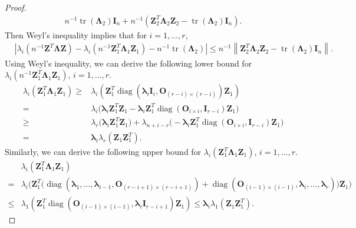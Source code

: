 \documentclass[12pt]{article} %
\DeclareMathOperator{\mytr}{tr}
\DeclareMathOperator{\mydiag}{diag}
\newcommand{\bZ}{\mathbf{Z}}
\newcommand{\bO}{\mathbf{O}}
\newcommand{\bI}{\mathbf{I}}
\newcommand{\bfsym}[1]{\ensuremath{\boldsymbol{#1}}}
\def\blambda {\bfsym {\lambda}}
\def\bLambda {\bfsym {\Lambda}}
\theoremstyle{definition}
\begin{document}
\begin{appendices}
\begin{proof}
\begin{equation*}
\begin{split}
        n^{-1}\mytr(\bLambda_2)\bI_n+
        n^{-1}\left(\bZ_2^T \bLambda_2 \bZ_2-\mytr(\bLambda_2)\bI_n\right)
        .
        \end{split}
    \end{equation*}
    Then Weyl's inequality implies that for $ i=1,\ldots, r$,
    \begin{equation}\label{eigenBoundForF}
        \begin{split}
        &
        \left|
        \lambda_i\left(n^{-1}\bZ^T \bLambda \bZ\right)
        -
        \lambda_i(n^{-1}\bZ_1^T \bLambda_1 \bZ_1)
        -
        n^{-1}
        \mytr(\bLambda_2)
        \right|
        \leq
        n^{-1}\left\|\bZ_2^T \bLambda_2 \bZ_2-
        \mytr(\bLambda_2)
        \bI_n\right\|.
        \end{split}
    \end{equation}
    Using Weyl's inequality, we can derive the following lower bound for $\lambda_i(n^{-1}\bZ_1^T \bLambda_1 \bZ_1)$, $ i=1,\ldots, r$.
\begin{equation*}\label{eq:DLower}
\begin{aligned}
\lambda_i(\bZ_1^T \bLambda_1 \bZ_1)
\geq&
\lambda_i(\bZ_1^T \mydiag(\blambda_i \bI_{i},\bO_{(r-i)\times(r-i)}) \bZ_1)
\\
    =&
    \lambda_i\Big( \blambda_i \bZ_1^T \bZ_1-\blambda_i\bZ_1^T \mydiag(\bO_{i\times i}, \bI_{r-i}) \bZ_1\Big)\\
    \geq&
    \lambda_r\Big( \blambda_i \bZ_1^T \bZ_1\Big)+\lambda_{n+i-r}\Big(-\blambda_i\bZ_1^T \mydiag(\bO_{i\times i}, \bI_{r-i}) \bZ_1\Big)\\
= &
\blambda_i \lambda_r(\bZ_1\bZ_1^T).
\end{aligned}
\end{equation*}
Similarly, we can derive the following upper bound for
$\lambda_i(\bZ_1^T \bLambda_1 \bZ_1)$, $i=1,\ldots,r$.
\begin{equation*}\label{eq:DUpper}
\begin{aligned}
&\lambda_i(\bZ_1^T \bLambda_1 \bZ_1)
\\
=&\lambda_i\Big(
\bZ_1^T \big(
\mydiag(\blambda_1,\ldots,\blambda_{i-1},\bO_{(r-i+1)\times(r-i+1)})+
\mydiag(\bO_{(i-1)\times(i-1)},\blambda_i,\ldots,\blambda_r)
\big)
\bZ_1
\Big)\\
    \leq&
\lambda_1(\bZ_1^T \mydiag(\bO_{(i-1)\times(i-1)},\blambda_i \bI_{r-i+1}) \bZ_1)
\leq  \blambda_i \lambda_1(\bZ_1\bZ_1^T).
\end{aligned}

\end{equation*}
\end{proof}
\end{appendices}
\end{document}
